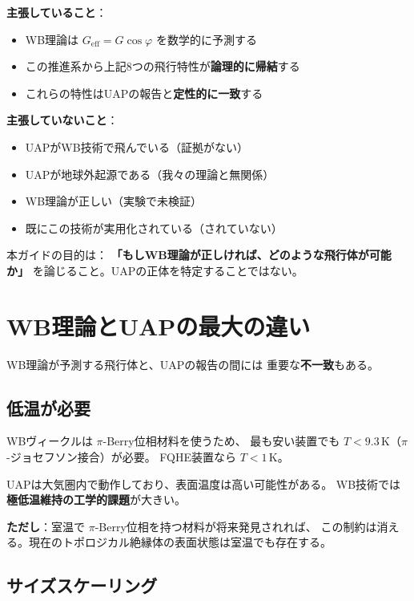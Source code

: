 \documentclass[11pt,a4paper]{article}
\begin{document}
\begin{tcolorbox}[colback=red!5,colframe=red!60!black,title=重要な区別]
\textbf{主張していること}：
\begin{itemize}
\item WB理論は $G_{\mathrm{eff}} = G\cos\varphi$ を数学的に予測する
\item この推進系から上記8つの飛行特性が\textbf{論理的に帰結}する
\item これらの特性はUAPの報告と\textbf{定性的に一致}する
\end{itemize}

\textbf{主張していないこと}：
\begin{itemize}
\item UAPがWB技術で飛んでいる（証拠がない）
\item UAPが地球外起源である（我々の理論と無関係）
\item WB理論が正しい（実験で未検証）
\item 既にこの技術が実用化されている（されていない）
\end{itemize}
\end{tcolorbox}

本ガイドの目的は：
\textbf{「もしWB理論が正しければ、どのような飛行体が可能か」}
を論じること。UAPの正体を特定することではない。

\section{WB理論とUAPの最大の違い}

WB理論が予測する飛行体と、UAPの報告の間には
重要な\textbf{不一致}もある。

\subsection{低温が必要}

WBヴィークルは $\pi$-Berry位相材料を使うため、
最も安い装置でも $T < 9.3$\,K（$\pi$-ジョセフソン接合）が必要。
FQHE装置なら $T < 1$\,K。

UAPは大気圏内で動作しており、表面温度は高い可能性がある。
WB技術では\textbf{極低温維持の工学的課題}が大きい。

\textbf{ただし}：室温で $\pi$-Berry位相を持つ材料が将来発見されれば、
この制約は消える。現在のトポロジカル絶縁体の表面状態は室温でも存在する。

\subsection{サイズスケーリング}
\end{document}

